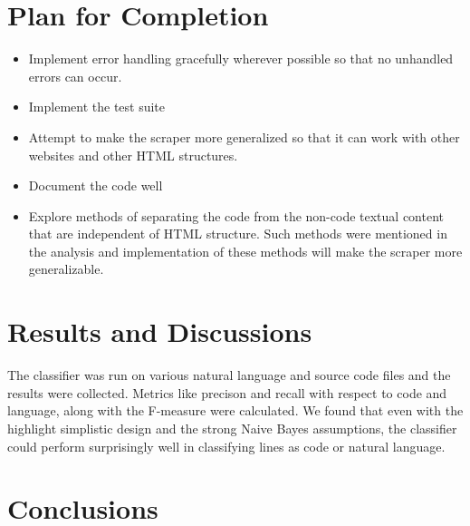 \documentclass[12pt]{scrreprt}
\begin{document}
\chapter{Plan for Completion}


\begin{itemize}
    \item Implement error handling gracefully wherever possible so that no unhandled errors can occur.
    \item Implement the test suite
    \item Attempt to make the scraper more generalized so that it can work with other websites and other HTML structures.
    \item Document the code well
    \item Explore methods of separating the code from the non-code textual content that are independent of HTML structure. Such methods were mentioned in the analysis and implementation of these methods will make the scraper more generalizable. 
\end{itemize}


\chapter{Results and Discussions}

The classifier was run on various natural language and source code files and the results were collected. Metrics like precison and recall with respect to code and language, along with the F-measure were calculated. We found that even with the highlight simplistic design and the strong Naive Bayes assumptions, the classifier could perform surprisingly well in classifying lines as code or natural language.







\chapter{Conclusions}
\end{document}
